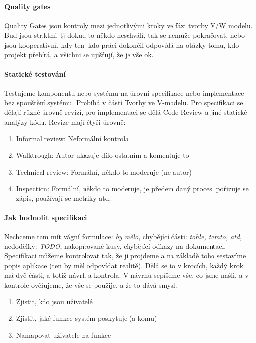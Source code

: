 \paragraph{Quality gates} Quality Gates jsou kontroly mezi jednotlivými kroky ve fázi tvorby V/W modelu. Buď jsou striktní, tj dokud to někdo neschválí, tak se nemůže pokračovat, nebo jsou kooperativní, kdy ten, kdo práci dokončil odpovídá na otázky tomu, kdo projekt přebírá, a všichni se ujišťují, že je vše ok.

\paragraph{Statické testování} Testujeme komponentu nebo systému na úrovni specifikace nebo implementace bez spouštění systému. Probíhá v částí Tvorby ve V-modelu. Pro specifikaci se dělají různé úrovně revizí, pro implementaci se dělá Code Review a jiné statické analýzy kódu. Revize mají čtyři úrovně:

\begin{enumerate}
\item Informal review: Neformální kontrola
\item Walktrough: Autor ukazuje dílo ostatním a komentuje to
\item Technical review: Formální, někdo to moderuje (ne autor)
\item Inspection: Formální, někdo to moderuje, je předem daný proces, pořizuje se zápis, používají se metriky atd.
\end{enumerate}

\paragraph{Jak hodnotit specifikaci} Nechceme tam mít vágní formulace: \textit{by mělo}, chybějící části: \textit{tohle, tamto, atd}, nedodělky: \textit{TODO}, nakopírované kusy, chybějící odkazy na dokumentaci. Specifikaci můžeme kontrolovat tak, že ji projdeme a na základě toho sestavíme popis aplikace (ten by měl odpovídat realitě). Dělá se to v krocích, každý krok má dvě části, a totiž návrh a kontrola. V návrhu sepíšeme vše, co jsme našli, a v kontrole ověřujeme, že vše se použije, a že to dává smysl.
\begin{enumerate}
\item Zjistit, kdo jsou uživatelé
\item Zjistit, jaké funkce systém poskytuje (a komu)
\item Namapovat uživatele na funkce
\end{enumerate}



